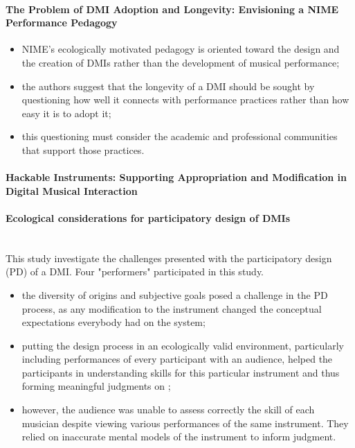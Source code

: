 \documentclass[11pt]{article}
\begin{document}
\paragraph{The Problem of DMI Adoption and Longevity: Envisioning a NIME Performance Pedagogy} \citep{marquez-borbon_problem_2018}
\begin{itemize}
    \item NIME's ecologically motivated pedagogy is oriented toward the design and the creation of DMIs rather than the development of musical performance;
    \item the authors suggest that the longevity of a DMI should be sought by questioning how well it connects with performance practices rather than how easy it is to adopt it;
    \item this questioning must consider the academic and professional communities that support those practices.
\end{itemize}

\paragraph{Hackable Instruments: Supporting Appropriation and Modification in Digital Musical Interaction} \citep{zappi_dimensionality_2014}

\paragraph{Ecological considerations for participatory design of DMIs} \citep{fyans_ecological_2012} \\
This study investigate the challenges presented with the participatory design (PD) of a DMI. Four "performers" participated in this study.
\begin{itemize}
    \item the diversity of origins and subjective goals posed a challenge in the PD process, as any modification to the instrument changed the conceptual expectations everybody had on the system;
    \item putting the design process in an ecologically valid environment, particularly including performances of every participant with an audience, helped the participants in understanding skills for this particular instrument and thus forming meaningful judgments on ;
    \item however, the audience was unable to assess correctly the skill of each musician despite viewing various performances of the same instrument. They relied on inaccurate mental models of the instrument to inform judgment. 
\end{itemize}
\end{document}
